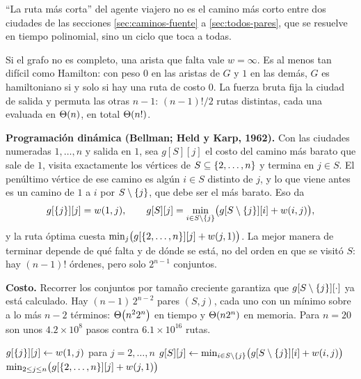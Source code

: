\documentclass[11pt,letterpaper]{article}
\begin{document}
\begin{ojo}
  ``La ruta más corta'' del agente viajero no es el camino más corto
  entre dos ciudades de las secciones \ref{sec:caminos-fuente} a
  \ref{sec:todos-pares}, que se resuelve en tiempo polinomial, sino un
  ciclo que toca a todas.
\end{ojo}

Si el grafo no es completo, una arista que falta vale $w = \infty$.
Es al menos tan difícil como Hamilton: con peso $0$ en las aristas de
$G$ y $1$ en las demás, $G$ es hamiltoniano si y solo si hay una ruta
de costo $0$. La fuerza bruta fija la ciudad de salida y permuta las
otras $n - 1$: $(n-1)!/2$ rutas distintas, cada una evaluada en
$\Theta\!\left(n\right)$, en total $\Theta\!\left(n!\right)$.

\textbf{Programación dinámica (Bellman; Held y Karp, 1962).} Con las
ciudades numeradas $1, \dots, n$ y salida en $1$, sea $g[S][j]$ el
costo del camino más barato que sale de $1$, visita exactamente los
vértices de $S \subseteq \left\{ 2, \dots, n \right\}$ y termina en $j \in S$.
El penúltimo vértice de ese camino es algún $i \in S$ distinto de
$j$, y lo que viene antes es un camino de $1$ a $i$ por
$S \setminus \left\{ j \right\}$, que debe ser el más barato. Eso da
\[
  g[\left\{ j \right\}][j] = w(1, j) , \qquad
  g[S][j] = \min_{i \in S \setminus \left\{ j \right\}}
            \bigl( g[S \setminus \left\{ j \right\}][i] + w(i, j) \bigr) ,
\]
y la ruta óptima cuesta
$\min_{j} \bigl( g[\left\{ 2, \dots, n \right\}][j] + w(j, 1) \bigr)$. La mejor
manera de terminar depende de qué falta y de dónde se está, no del
orden en que se visitó $S$: hay $(n-1)!$ órdenes, pero solo $2^{n-1}$
conjuntos.

\textbf{Costo.} Recorrer los conjuntos por tamaño creciente garantiza
que $g[S \setminus \left\{ j \right\}][\cdot]$ ya está calculado. Hay
$(n-1)\, 2^{n-2}$ pares $(S, j)$, cada uno con un mínimo sobre a lo
más $n - 2$ términos: $\Theta\!\left(n^2 2^n\right)$ en tiempo y $\Theta\!\left(n 2^n\right)$ en
memoria. Para $n = 20$ son unos $4.2 \times 10^8$ pasos contra
$6.1 \times 10^{16}$ rutas.

\begin{algorithm}[H]
\caption{\textsc{Agente-Viajero}$(w, n)$: programación dinámica de
         Held y Karp}
\label{alg:hamilton-held-karp}
\begin{algorithmic}[1]
  \State $g[\left\{ j \right\}][j] \gets w(1, j)$ para $j = 2, \dots, n$
   
        \State $g[S][j] \gets \min_{i \in S \setminus \left\{ j \right\}}
               \bigl( g[S \setminus \left\{ j \right\}][i] + w(i, j) \bigr)$
      \EndFor
    \EndFor
  \EndFor
  \State \Return $\min_{2 \le j \le n}
         \bigl( g[\left\{ 2, \dots, n \right\}][j] + w(j, 1) \bigr)$
\EndProcedure
\end{algorithmic}
\end{algorithm}
\end{document}
